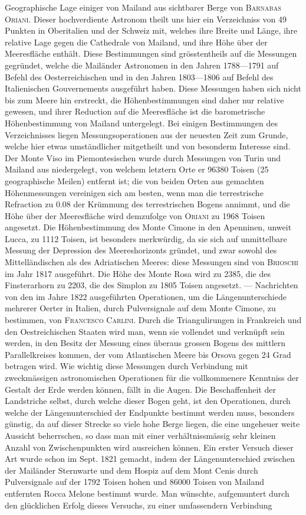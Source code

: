 Geographische Lage einiger von Mailand aus sichtbarer Berge von \textsc{Barnabas Oriani}. Dieser hochverdiente Astronom theilt uns hier ein Verzeichniss von 49 Punkten in Oberitalien und der Schweiz mit, welches ihre Breite und Länge, ihre relative Lage gegen die Cathedrale von Mailand, und ihre Höhe über der Meeresfläche enthält. Diese Bestimmungen sind grösstentheils auf die Messungen gegründet, welche die Mailänder Astronomen in den Jahren 1788---1791 auf Befehl des Oesterreichischen und in den Jahren 1803---1806 auf Befehl des Italienischen Gouvernements ausgeführt haben. Diese Messungen haben sich nicht bis zum Meere hin erstreckt, die Höhenbestimmungen sind daher nur relative gewesen, und ihrer Reduction auf die Meeresfläche ist die barometrische Höhenbestimmung von Mailand untergelegt. Bei einigen Bestimmungen des Verzeichnisses liegen Messungsoperationen aus der neuesten Zeit zum Grunde, welche hier etwas umständlicher mitgetheilt und von besonderm Interesse sind. Der Monte Viso im Piemontesischen wurde durch Messungen von Turin und Mailand aus niedergelegt, von welchem letztern Orte er 96380 Toisen (25 geographische Meilen) entfernt ist; die von beiden Orten aus gemachten Höhenmessungen vereinigen sich am besten, wenn man die terrestrische Refraction zu 0.08 der Krümmung des terrestrischen Bogens annimmt, und die Höhe über der Meeresfläche wird demzufolge von \textsc{Oriani} zu 1968 Toisen angesetzt. Die Höhenbestimmung des Monte Cimone in den Apenninen, unweit Lucca, zu 1112 Toisen, ist besonders merkwürdig, da sie sich auf unmittelbare Messung der Depression des Meereshorizonts gründet, und zwar sowohl des Mittelländischen als des Adriatischen Meeres: diese Messungen sind von \textsc{Brioschi} im Jahr 1817 ausgeführt. Die Höhe des Monte Rosa wird zu 2385, die des Finsterarhorn zu 2203, die des Simplon zu 1805 Toisen angesetzt. --- Nachrichten von den im Jahre 1822 ausgeführten Operationen, um die Längenunterschiede mehrerer Oerter in Italien, durch Pulversignale auf dem Monte Cimone, zu bestimmen, von \textsc{Francesco Carlini}. Durch die Triangulirungen in Frankreich und den Oestreichischen Staaten wird man, wenn sie vollendet und verknüpft sein werden, in den Besitz der Messung eines überaus grossen Bogens des mittlern Parallelkreises kommen, der vom Atlantischen Meere bis Orsova gegen 24 Grad betragen wird. Wie wichtig diese Messungen durch Verbindung mit zweckmässigen astronomischen Operationen für die vollkommenere Kenntniss der Gestalt der Erde werden können, fällt in die Augen. Die Beschaffenheit der Landstriche selbst, durch welche dieser Bogen geht, ist den Operationen, durch welche der Längenunterschied der Endpunkte bestimmt werden muss, besonders günstig, da auf dieser Strecke so viele hohe Berge liegen, die eine ungeheuer weite Aussicht beherrschen, so dass man mit einer verhältnissmässig sehr kleinen Anzahl von Zwischenpunkten wird ausreichen können. Ein erster Versuch dieser Art wurde schon im Sept. 1821 gemacht, indem der Längenunterschied zwischen der Mailänder Sternwarte und dem Hospiz auf dem Mont Cenis durch Pulversignale auf der 1792 Toisen hohen und 86000 Toisen von Mailand entfernten Rocca Melone bestimmt wurde. Man wünschte, aufgemuntert durch den glücklichen Erfolg dieses Versuchs, zu einer  umfassendern Verbindung 